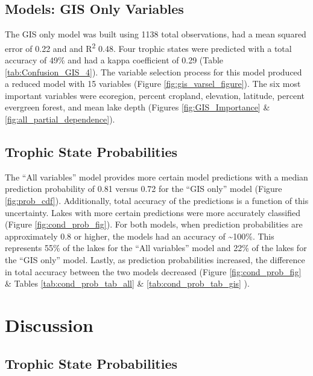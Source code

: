 \documentclass[12pt,]{article}
\begin{document}
\subsection{Models: GIS Only Variables}\label{models-gis-only-variables}

The GIS only model was built using 1138 total observations, had a mean
squared error of 0.22 and and R\textsuperscript{2} 0.48. Four trophic
states were predicted with a total accuracy of 49\% and had a kappa
coefficient of 0.29 (Table \ref{tab:Confusion_GIS_4}). The variable
selection process for this model produced a reduced model with 15
variables (Figure \ref{fig:gis_varsel_figure}). The six most important
variables were ecoregion, percent cropland, elevation, latitude, percent
evergreen forest, and mean lake depth (Figures \ref{fig:GIS_Importance}
\& \ref{fig:all_partial_dependence}).

\subsection{Trophic State
Probabilities}\label{trophic-state-probabilities-1}

The ``All variables'' model provides more certain model predictions with
a median prediction probability of 0.81 versus 0.72 for the ``GIS only''
model (Figure \ref{fig:prob_cdf}). Additionally, total accuracy of the
predictions is a function of this uncertainty. Lakes with more certain
predictions were more accurately classified (Figure
\ref{fig:cond_prob_fig}). For both models, when prediction probabilities
are approximately 0.8 or higher, the models had an accuracy of
\textasciitilde{}100\%. This represents 55\% of the lakes for the ``All
variables'' model and 22\% of the lakes for the ``GIS only'' model.
Lastly, as prediction probabilities increased, the difference in total
accuracy between the two models decreased (Figure
\ref{fig:cond_prob_fig} \& Tables \ref{tab:cond_prob_tab_all} \&
\ref{tab:cond_prob_tab_gis} ).

\section{Discussion}\label{discussion}

\subsection{Trophic State
Probabilities}\label{trophic-state-probabilities-2}
\end{document}
